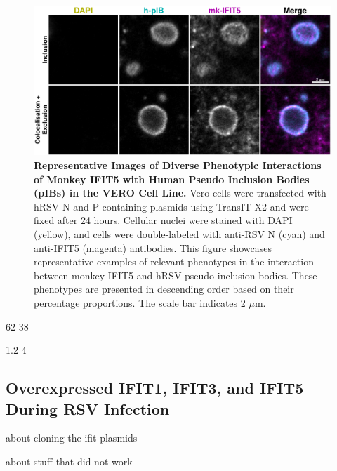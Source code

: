 \begin{figure}
    \centering
    \includegraphics[width=1\linewidth]{09. Chapter 4/Figs/01. pIB/05. IFIT5/03. i5-vero-hnhp.pdf}
    \caption[Representative Images of Diverse Phenotypic Interactions of Monkey IFIT5 with Human Pseudo Inclusion Bodies (pIBs) in the VERO Cell Line.]{\textbf{Representative Images of Diverse Phenotypic Interactions of Monkey IFIT5 with Human Pseudo Inclusion Bodies (pIBs) in the VERO Cell Line.} Vero cells were transfected with hRSV N and P containing plasmids using TransIT-X2 and were fixed after 24 hours. Cellular nuclei were stained with DAPI (yellow), and cells were double-labeled with anti-RSV N (cyan) and anti-IFIT5 (magenta) antibodies. This figure showcases representative examples of relevant phenotypes in the interaction between monkey IFIT5 and hRSV pseudo inclusion bodies. These phenotypes are presented in descending order based on their percentage proportions. The scale bar indicates 2 \(\mu \mbox{m}\).}
    \label{fig:Representative Images of Diverse Phenotypic Interactions of Monkey IFIT5 with Human Pseudo Inclusion Bodies (pIBs) in the VERO Cell Line}
\end{figure}

62 38

1.2 4


\subsection{Overexpressed IFIT1, IFIT3, and IFIT5 During RSV Infection} \label{subsec:Overexpressed IFIT1, IFIT3, and IFIT5 During RSV Infection}

about cloning the ifit plasmids 




about stuff that did not work









